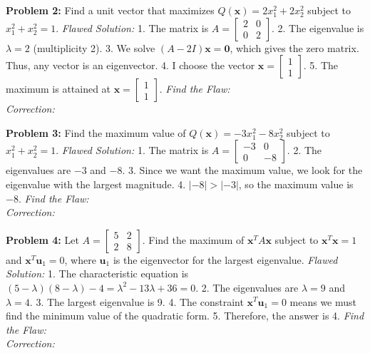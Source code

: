 \documentclass[11pt, letterpaper]{article}
\theoremstyle{definition}
\theoremstyle{remark}
\begin{document}
\vspace{1em}
\textbf{Problem 2:} Find a unit vector that maximizes $Q(\mathbf{x}) = 2x_1^2 + 2x_2^2$ subject to $x_1^2 + x_2^2 = 1$.
\textit{Flawed Solution:}
1. The matrix is $A = \begin{bmatrix} 2 & 0 \\ 0 & 2 \end{bmatrix}$.
2. The eigenvalue is $\lambda = 2$ (multiplicity 2).
3. We solve $(A - 2I)\mathbf{x} = \mathbf{0}$, which gives the zero matrix. Thus, any vector is an eigenvector.
4. I choose the vector $\mathbf{x} = \begin{bmatrix} 1 \\ 1 \end{bmatrix}$.
5. The maximum is attained at $\mathbf{x} = \begin{bmatrix} 1 \\ 1 \end{bmatrix}$.
\textit{Find the Flaw:} \hrulefill \\
\textit{Correction:} \hrulefill

\vspace{1em}
\textbf{Problem 3:} Find the maximum value of $Q(\mathbf{x}) = -3x_1^2 - 8x_2^2$ subject to $x_1^2 + x_2^2 = 1$.
\textit{Flawed Solution:}
1. The matrix is $A = \begin{bmatrix} -3 & 0 \\ 0 & -8 \end{bmatrix}$.
2. The eigenvalues are $-3$ and $-8$.
3. Since we want the maximum value, we look for the eigenvalue with the largest magnitude.
4. $|-8| > |-3|$, so the maximum value is $-8$.
\textit{Find the Flaw:} \hrulefill \\
\textit{Correction:} \hrulefill

\vspace{1em}
\textbf{Problem 4:} Let $A = \begin{bmatrix} 5 & 2 \\ 2 & 8 \end{bmatrix}$. Find the maximum of $\mathbf{x}^T A \mathbf{x}$ subject to $\mathbf{x}^T\mathbf{x} = 1$ and $\mathbf{x}^T\mathbf{u}_1 = 0$, where $\mathbf{u}_1$ is the eigenvector for the largest eigenvalue.
\textit{Flawed Solution:}
1. The characteristic equation is $(5-\lambda)(8-\lambda) - 4 = \lambda^2 - 13\lambda + 36 = 0$.
2. The eigenvalues are $\lambda = 9$ and $\lambda = 4$.
3. The largest eigenvalue is 9.
4. The constraint $\mathbf{x}^T\mathbf{u}_1 = 0$ means we must find the minimum value of the quadratic form.
5. Therefore, the answer is 4.
\textit{Find the Flaw:} \hrulefill \\
\textit{Correction:} \hrulefill
\end{document}
